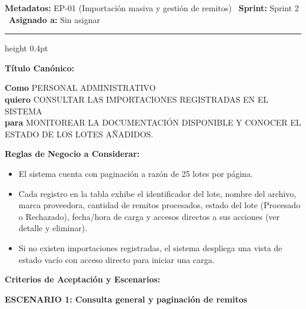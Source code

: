 \documentclass[a4paper,9pt]{article}
\begin{document}
\begin{tcolorbox}[hucard, title={\textbf{HU-37: CONSULTAR IMPORTACIONES REGISTRADAS} \hfill \scriptsize \colorbox{tealstatus}{\textbf{\ Accepted\ }} \quad \colorbox{white}{\textcolor{primarydark}{\textbf{\ 2 pts\ }}}}]
\vspace{-1pt}
\noindent\textbf{\footnotesize Metadatos:} EP-01 (Importación masiva y gestión de remitos) \textbar\ \textbf{Sprint:} Sprint 2 \textbar\ \textbf{Asignado a:} Sin asignar\par\vspace{2pt}
\hrule height 0.4pt\par\vspace{3pt}
\noindent\textbf{\footnotesize Título Canónico:}\par\vspace{1pt}
{\small \textbf{Como} PERSONAL ADMINISTRATIVO \\ \textbf{quiero} CONSULTAR LAS IMPORTACIONES REGISTRADAS  EN EL SISTEMA \\ \textbf{para} MONITOREAR LA DOCUMENTACIÓN DISPONIBLE Y CONOCER EL ESTADO DE LOS LOTES AÑADIDOS.}\par\vspace{3pt}
\noindent\textbf{\footnotesize Reglas de Negocio a Considerar:}\par\vspace{1pt}
{\footnotesize
\begin{itemize}[leftmargin=12pt, nosep, itemsep=1.5pt, topsep=1pt]
\item El sistema cuenta con paginación a razón de 25 lotes por página.
\item Cada registro en la tabla exhibe el identificador del lote, nombre del archivo, marca proveedora, cantidad de remitos procesados, estado del lote (Procesado o Rechazado), fecha/hora de carga y accesos directos a sus acciones (ver detalle y eliminar).
\item Si no existen importaciones registradas, el sistema despliega una vista de estado vacío con acceso directo para iniciar una carga.
\end{itemize}
}\par\vspace{3pt}
\noindent\textbf{\footnotesize Criterios de Aceptación y Escenarios:}\par\vspace{2pt}
{\footnotesize
\noindent\textbf{\textcolor{secondarydark}{ESCENARIO 1:  Consulta general y paginación de remitos}}\par\vspace{1pt}
}
\end{tcolorbox}
\end{document}
